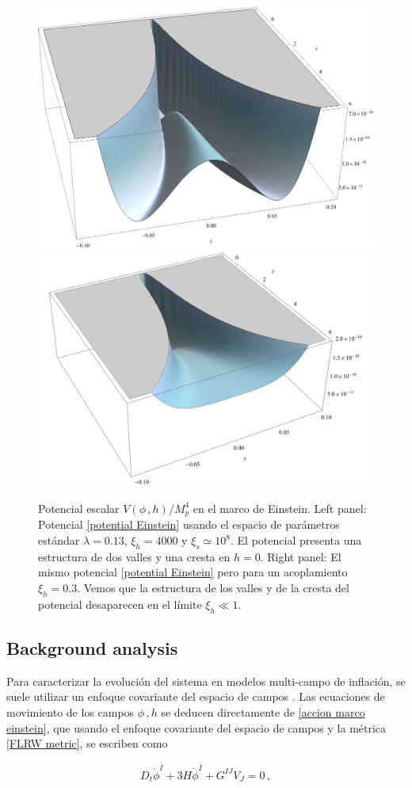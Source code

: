 \documentclass[12pt,a4paper,english,nofootinbib]{revtex4}
\newcommand{\beq}{\begin{eqnarray}}
\newcommand{\enq}{\end{eqnarray}}
\begin{document}
\begin{figure}
    \centering
    \includegraphics[width=0.48\linewidth]{Figures/potential1.png}\quad 
     \includegraphics[width=0.48\linewidth]{Figures/potential_xi_0.3.pdf}
    \caption{Potencial escalar $V(\phi\,,h)/M_p^4$ en el marco de Einstein. Left panel: Potencial \eqref{potential Einstein} usando el espacio de parámetros estándar $\lambda = 0.13$, $\xi_h = 4000  $ y $\xi_s \simeq 10^8 $. El potencial presenta una estructura de dos valles y una cresta en $h=0$. Right panel: El mismo potencial \eqref{potential Einstein} pero para un acoplamiento $\xi_h = 0.3$. Vemos que la estructura de los valles y de la cresta del potencial desaparecen en el límite $\xi_h \ll 1$.}
    \label{fig1}
\end{figure}



\subsection{Background analysis}

Para caracterizar la evolución del sistema en modelos multi-campo de inflación, se suele utilizar un enfoque covariante  del espacio de campos  \cite{Achucarro2011, Gong2011, Gong2017, KARAMITSOS2018}. Las ecuaciones de movimiento  de los campos $\phi\,,h$ se deducen directamente de \eqref{accion marco einstein}, que usando el enfoque covariante del espacio de campos y la métrica \eqref{FLRW metric}, se escriben como

\beq 
    D_t\dot{\phi}^I + 3H\dot{\phi}^I + G^{IJ}V_J = 0\,,
    \label{EoM covariant}
\enq 
\end{document}
